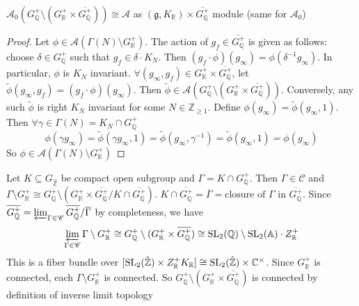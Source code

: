 \documentclass[main]{subfiles}
\begin{document}
\begin{lemma}
$\mathcal A_0(G^+_{\mathbb Q}\setminus(G^+_{\mathbb R}\times\overline{G^+_{\mathbb Q}}))\cong\mathcal A$ as $(\mathfrak g,K_{\mathbb R})\times\overline{G^+_{\mathbb Q}}$ module (same for $\mathcal A_0$)
\end{lemma}

\begin{proof}
Let $\phi\in\mathcal A(\Gamma(N)\setminus G^+_{\mathbb R})$. The action of $g_f\in\overline{G^+_{\mathbb Q}}$ is given as follows: choose $\delta\in G^+_{\mathbb Q}$ such that $g_f\in\delta\cdot K_N$. Then $(g_f\cdot\phi)(g_\infty)=\phi(\delta^{-1}g_\infty)$. In particular, $\phi$ is $K_N$ invariant. $\forall (g_\infty,g_f)\in G^+_{\mathbb R}\times\overline{G^+_{\mathbb Q}}$, let $\tilde\phi(g_\infty,g_f)=(g_f\cdot\phi)(g_\infty)$. Then $\tilde\phi\in\mathcal A(G^+_{\mathbb Q}\setminus(G^+_{\mathbb R}\times\overline{G^+_{\mathbb Q}}))$. Conversely, any such $\tilde\phi$ is right $K_N$ invariant for some $N\in\mathbb Z_{\geq1}$. Define $\phi(g_\infty)=\tilde\phi(g_\infty,1)$. Then $\forall\gamma\in\Gamma(N)=K_N\cap G_{\mathbb Q}^+$
\[\phi(\gamma g_\infty)=\tilde\phi(\gamma g_\infty,1)=\tilde\phi(g_\infty,\gamma^{-1})=\tilde\phi(g_\infty,1)=\phi(g_\infty)\]
So $\phi\in\mathcal A(\Gamma(N)\setminus G^+_{\mathbb R})$
\end{proof}

\begin{remark}
Let $K\subseteq G_{\hat{\mathbb Z}}$ be compact open subgroup and $\Gamma=K\cap G^+_{\mathbb Q}$. Then $\Gamma\in\mathscr C$ and $\Gamma\setminus G^+_{\mathbb R}\cong G^+_{\mathbb Q}\setminus (G^+_{\mathbb R}\times\overline{G_{\mathbb Q}^+}/ K\cap\overline{G_{\mathbb Q}^+})$. $K\cap\overline{G_{\mathbb Q}^+}=\overline\Gamma=\text{closure of }\Gamma$ in $\overline{G^+_{\mathbb Q}}$. Since $\overline{G_{\mathbb Q}^+}=\varprojlim_{\Gamma\in\mathscr C}\overline{G^+_{\mathbb Q}}/\overline\Gamma$ by completeness, we have
\[\varprojlim_{\Gamma\in\mathscr C}\Gamma\setminus G^+_{\mathbb R}\cong G^+_{\mathbb Q}\setminus(G^+_{\mathbb R}\times\overline{G^+_{\mathbb Q}})\cong\operatorname{SL}_2(\mathbb Q)\setminus\operatorname{SL}_2(\mathbb A)\cdot Z_{\mathbb R}^+\]
This is a fiber bundle over $[\operatorname{SL}_2(\hat{\mathbb Z})\times Z^+_{\mathbb R}K_{\mathbb R}]\cong\operatorname{SL}_2(\hat{\mathbb Z})\times\mathbb C^\times$. Since $G^+_{\mathbb R}$ is connected, each $\Gamma\setminus G^+_{\mathbb R}$ is connected. So $G^+_{\mathbb Q}\setminus(G^+_{\mathbb R}\times\overline{G^+_{\mathbb Q}})$ is connected by definition of inverse limit topology
\end{remark}
\end{document}
